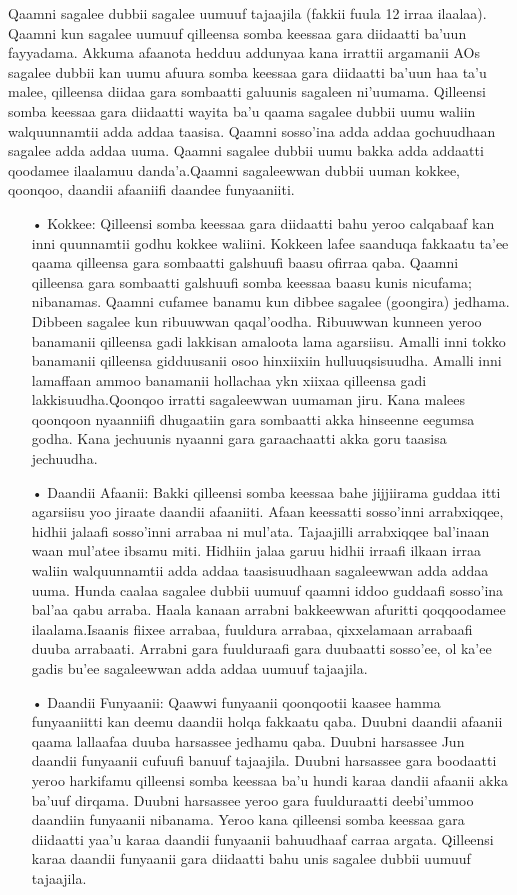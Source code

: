 \documentclass[11pt,b5paper]{book}
\begin{document}
Qaamni sagalee dubbii sagalee uumuuf tajaajila (fakkii fuula 12 irraa ilaalaa). Qaamni kun sagalee uumuuf qilleensa somba keessaa gara diidaatti ba’uun fayyadama. Akkuma afaanota
hedduu addunyaa kana irrattii argamanii AOs sagalee dubbii kan uumu afuura somba keessaa gara diidaatti ba’uun haa ta’u malee, qilleensa diidaa gara sombaatti galuunis sagaleen
ni’uumama. Qilleensi somba keessaa gara diidaatti wayita ba’u qaama sagalee dubbii uumu waliin walquunnamtii adda addaa taasisa. Qaamni sosso’ina adda addaa gochuudhaan sagalee
adda addaa uuma. Qaamni sagalee dubbii uumu bakka adda addaatti qoodamee ilaalamuu danda’a.Qaamni sagaleewwan dubbii uuman kokkee, qoonqoo, daandii afaaniifi daandee funyaaniiti.
\begin{itemize}
\item[•]Kokkee: Qilleensi somba keessaa gara diidaatti bahu yeroo calqabaaf kan inni quunnamtii godhu kokkee waliini. Kokkeen lafee saanduqa fakkaatu ta’ee qaama qilleensa gara sombaatti
galshuufi baasu ofirraa qaba. Qaamni qilleensa gara sombaatti galshuufi somba keessaa baasu kunis nicufama; nibanamas. Qaamni cufamee banamu kun dibbee sagalee (goongira)
jedhama. Dibbeen sagalee kun ribuuwwan qaqal’oodha. Ribuuwwan kunneen yeroo banamanii qilleensa gadi lakkisan amaloota lama agarsiisu. Amalli inni tokko banamanii qilleensa
gidduusanii osoo hinxiixiin hulluuqsisuudha. Amalli inni lamaffaan ammoo banamanii hollachaa ykn xiixaa qilleensa gadi lakkisuudha.Qoonqoo irratti sagaleewwan uumaman jiru. Kana
malees qoonqoon nyaanniifi dhugaatiin gara sombaatti akka hinseenne eegumsa godha. Kana jechuunis nyaanni gara garaachaatti akka goru taasisa jechuudha.

\item[•] Daandii Afaanii: Bakki qilleensi somba keessaa bahe jijjiirama guddaa itti agarsiisu yoo jiraate daandii afaaniiti. Afaan keessatti sosso’inni arrabxiqqee, hidhii jalaafi sosso’inni
arrabaa ni mul’ata. Tajaajilli arrabxiqqee bal’inaan waan mul’atee ibsamu miti. Hidhiin jalaa garuu hidhii irraafi ilkaan irraa waliin walquunnamtii adda addaa taasisuudhaan
sagaleewwan adda addaa uuma. Hunda caalaa sagalee dubbii uumuuf qaamni iddoo guddaafi sosso’ina bal’aa qabu arraba. Haala kanaan arrabni bakkeewwan afuritti qoqqoodamee
ilaalama.Isaanis fiixee arrabaa, fuuldura arrabaa, qixxelamaan arrabaafi duuba arrabaati. Arrabni gara fuulduraafi gara duubaatti sosso’ee, ol ka’ee gadis bu’ee sagaleewwan adda
addaa uumuuf tajaajila.

\item[•] Daandii Funyaanii: Qaawwi funyaanii qoonqootii kaasee hamma funyaaniitti kan deemu daandii holqa fakkaatu qaba. Duubni daandii afaanii qaama lallaafaa duuba harsassee
jedhamu qaba. Duubni harsassee Jun daandii funyaanii cufuufi banuuf tajaajila. Duubni harsassee gara boodaatti yeroo harkifamu qilleensi somba keessaa ba’u hundi karaa dandii
afaanii akka ba’uuf dirqama. Duubni harsassee yeroo gara fuulduraatti deebi’ummoo daandiin funyaanii nibanama. Yeroo kana qilleensi somba keessaa gara diidaatti yaa’u karaa daandii
funyaanii bahuudhaaf carraa argata. Qilleensi karaa daandii funyaanii gara diidaatti bahu unis sagalee dubbii uumuuf tajaajila.

\end{itemize}
\end{document}
